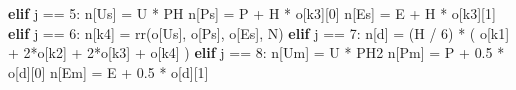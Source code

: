 \documentclass[
  a4paper,
]{ltjsarticle}
\newenvironment{Shaded}{}{}
\newcommand{\ControlFlowTok}[1]{\textcolor[rgb]{0.00,0.44,0.13}{\textbf{#1}}}
\newcommand{\DecValTok}[1]{\textcolor[rgb]{0.25,0.63,0.44}{#1}}
\newcommand{\FloatTok}[1]{\textcolor[rgb]{0.25,0.63,0.44}{#1}}
\newcommand{\NormalTok}[1]{#1}
\newcommand{\OperatorTok}[1]{\textcolor[rgb]{0.40,0.40,0.40}{#1}}
\newcommand{\StringTok}[1]{\textcolor[rgb]{0.25,0.44,0.63}{#1}}
\begin{document}
\begin{Shaded}
\begin{Highlighting}[]
    \ControlFlowTok{elif}\NormalTok{ j }\OperatorTok{==} \DecValTok{5}\NormalTok{:}
\NormalTok{        n[}\StringTok{\textquotesingle{}Us\textquotesingle{}}\NormalTok{] }\OperatorTok{=}\NormalTok{ U }\OperatorTok{*}\NormalTok{ PH}
\NormalTok{        n[}\StringTok{\textquotesingle{}Ps\textquotesingle{}}\NormalTok{] }\OperatorTok{=}\NormalTok{ P }\OperatorTok{+}\NormalTok{ H }\OperatorTok{*}\NormalTok{ o[}\StringTok{\textquotesingle{}k3\textquotesingle{}}\NormalTok{][}\DecValTok{0}\NormalTok{]}
\NormalTok{        n[}\StringTok{\textquotesingle{}Es\textquotesingle{}}\NormalTok{] }\OperatorTok{=}\NormalTok{ E }\OperatorTok{+}\NormalTok{ H }\OperatorTok{*}\NormalTok{ o[}\StringTok{\textquotesingle{}k3\textquotesingle{}}\NormalTok{][}\DecValTok{1}\NormalTok{]}
    \ControlFlowTok{elif}\NormalTok{ j }\OperatorTok{==} \DecValTok{6}\NormalTok{:}
\NormalTok{        n[}\StringTok{\textquotesingle{}k4\textquotesingle{}}\NormalTok{] }\OperatorTok{=}\NormalTok{ rr(o[}\StringTok{\textquotesingle{}Us\textquotesingle{}}\NormalTok{], o[}\StringTok{\textquotesingle{}Ps\textquotesingle{}}\NormalTok{], o[}\StringTok{\textquotesingle{}Es\textquotesingle{}}\NormalTok{], N)}
    \ControlFlowTok{elif}\NormalTok{ j }\OperatorTok{==} \DecValTok{7}\NormalTok{:}
\NormalTok{        n[}\StringTok{\textquotesingle{}d\textquotesingle{}}\NormalTok{] }\OperatorTok{=}\NormalTok{ (H }\OperatorTok{/} \DecValTok{6}\NormalTok{) }\OperatorTok{*}\NormalTok{ (}
\NormalTok{            o[}\StringTok{\textquotesingle{}k1\textquotesingle{}}\NormalTok{] }\OperatorTok{+} \DecValTok{2}\OperatorTok{*}\NormalTok{o[}\StringTok{\textquotesingle{}k2\textquotesingle{}}\NormalTok{] }\OperatorTok{+} \DecValTok{2}\OperatorTok{*}\NormalTok{o[}\StringTok{\textquotesingle{}k3\textquotesingle{}}\NormalTok{] }\OperatorTok{+}\NormalTok{ o[}\StringTok{\textquotesingle{}k4\textquotesingle{}}\NormalTok{]}
\NormalTok{        )}
    \ControlFlowTok{elif}\NormalTok{ j }\OperatorTok{==} \DecValTok{8}\NormalTok{:}
\NormalTok{        n[}\StringTok{\textquotesingle{}Um\textquotesingle{}}\NormalTok{] }\OperatorTok{=}\NormalTok{ U }\OperatorTok{*}\NormalTok{ PH2}
\NormalTok{        n[}\StringTok{\textquotesingle{}Pm\textquotesingle{}}\NormalTok{] }\OperatorTok{=}\NormalTok{ P }\OperatorTok{+} \FloatTok{0.5} \OperatorTok{*}\NormalTok{ o[}\StringTok{\textquotesingle{}d\textquotesingle{}}\NormalTok{][}\DecValTok{0}\NormalTok{]}
\NormalTok{        n[}\StringTok{\textquotesingle{}Em\textquotesingle{}}\NormalTok{] }\OperatorTok{=}\NormalTok{ E }\OperatorTok{+} \FloatTok{0.5} \OperatorTok{*}\NormalTok{ o[}\StringTok{\textquotesingle{}d\textquotesingle{}}\NormalTok{][}\DecValTok{1}\NormalTok{]}

\end{Highlighting}
\end{Shaded}
\end{document}

